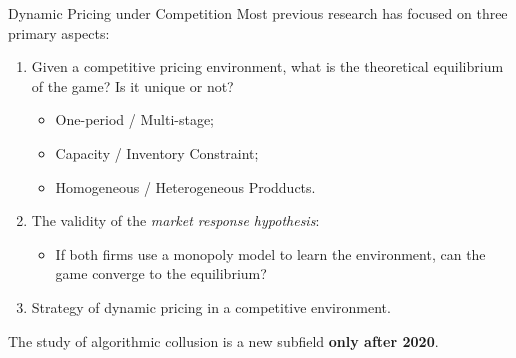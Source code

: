 \documentclass[8pt]{beamer}
\begin{document}
\begin{frame}{Dynamic Pricing under Competition}
    Most previous research has focused on three primary aspects:
    \vspace{1cm}
    \begin{enumerate}
        \item Given a competitive pricing environment, what is the theoretical equilibrium of the game? Is it unique or not?
        \begin{itemize}
            \item One-period / Multi-stage;
            \item Capacity / Inventory Constraint;
            \item Homogeneous / Heterogeneous Prodducts.
        \end{itemize}
        \item The validity of the \textit{market response hypothesis}:
        \begin{itemize}
            \item If both firms use a monopoly model to learn the environment, can the game converge to the equilibrium?
        \end{itemize}
        \item Strategy of dynamic pricing in a competitive environment.
    \end{enumerate}
    \vspace{1cm}
    The study of algorithmic collusion is a new subfield \textbf{\textcolor{cuhksz2}{only after 2020}}. 
\end{frame}
\end{document}
